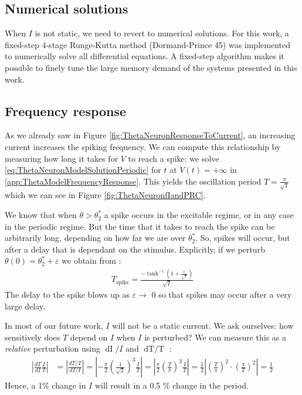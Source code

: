 \subsection{Numerical solutions} \label{sec:TheThetaNeuronModelODE45}
When $I$ is not static, we need to revert to numerical solutions. For this work, a fixed-step 4-stage Runge-Kutta method (Dormand-Prince 45) was implemented to numerically solve all differential equations. A fixed-step algorithm makes it possible to finely tune the large memory demand of the systems presented in this work. 


\subsection{Frequency response} \label{sec:TheThetaNeuronModelFrequencyResponse}
As we already saw in Figure \ref{fig:ThetaNeuronResponseToCurrent}, an increasing current increases the spiking frequency. We can compute this relationship by measuring how long it takes for $V$ to reach a spike: we solve \eqref{eq:ThetaNeuronModelSolutionPeriodic} for $t$ at $V(t) = +\infty$ in \ref{app:ThetaModelFrequencyResponse}. This yields the oscillation period $T = \frac{\pi}{\sqrt{I}}$ which we can see in Figure \ref{fig:ThetaNeuronfIandPRC}. 

We know that when $\theta > \theta^{\ast}_{2}$ a spike occurs in the excitable regime, or in any case in the periodic regime. But the time that it takes to reach the spike can be arbitrarily long, depending on how far we are over $\theta^{\ast}_{2}$. So, spikes will occur, but after a delay that is dependant on the stimulus. Explicitly, if we perturb $\theta(0) = \theta^{\ast}_{2} + \varepsilon$ we obtain from \cite{Gutkin2014}:
\begin{align*}
T_{\text {spike}} = \frac{-\tanh ^{-1}\left(1+\frac{\epsilon}{\sqrt{I}}\right)}{\sqrt{I}}
\end{align*}
The delay to the spike blows up as $\varepsilon \rightarrow$ 0 so that spikes may occur after a very large delay.

In most of our future work, $I$ will not be a static current. We ask ourselves: how sensitively does $T$ depend on $I$ when $I$ is perturbed? We can measure this as a \textsl{relative} perturbation using $\mathop{dI}/I$ and $\mathop{dT/T}$ \cite{IntroductionModelingDynamics} :
\begin{align*}
\left| \frac{dT}{dI} \frac{I}{T} \right| &= \left| \frac{dT / T}{dI / I}\right| 
= \left|- \frac{\pi}{2} \left(\frac{1}{\sqrt{I}}\right)^3 \frac{I}{T} \right| 
= \left| \frac{\pi}{2} \left(\frac{T}{\pi}\right)^3 \frac{I}{T} \right| 
= \frac{1}{2} \left|\left(\frac{T}{\pi}\right)^2 \cdot \left(\frac{\pi}{T}\right)^2 \right| = \frac{1}{2}
\end{align*}
Hence, a 1\% change in $I$ will result in a 0.5 \% change in the period.

